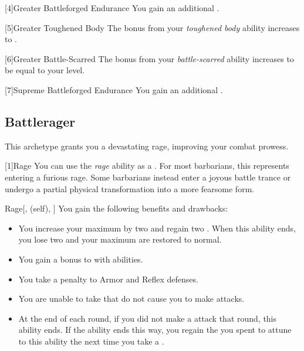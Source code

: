         [4]{Greater Battleforged Endurance} You gain an additional .

        [5]{Greater Toughened Body} The bonus from your \textit{toughened body} ability increases to .

        [6]{Greater Battle-Scarred}
        The bonus from your \textit{battle-scarred} ability increases to be equal to your level.

        [7]{Supreme Battleforged Endurance} You gain an additional .

    \subsection{Battlerager}\label{Rage}
        This archetype grants you a devastating rage, improving your combat prowess.

        [1]{Rage} You can use the \textit{rage} ability as a .
        For most barbarians, this represents entering a furious rage.
        Some barbarians instead enter a joyous battle trance or undergo a partial physical transformation into a more fearsome form.
        \begin{attuneability}{Rage}[,  (self), ]
            You gain the following benefits and drawbacks:
            \begin{itemize}
                \item You increase your maximum  by two and regain two .
                    When this ability ends, you lose two  and your maximum  are restored to normal.
                \item You gain a  bonus to  with  abilities.
                \item You take a  penalty to Armor and Reflex defenses.
                \item You are unable to take  that do not cause you to make  attacks.
                \item At the end of each round, if you did not make a  attack that round, this ability ends.
                    If the ability ends this way, you regain the  you spent to attune to this ability the next time you take a .
            \end{itemize}
        \end{attuneability}

